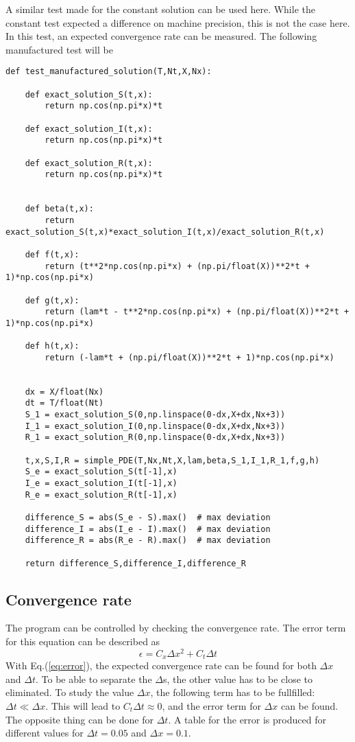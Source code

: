 \documentclass[%
twoside,                 %
final,                   %
chapterprefix=true,      %
open=right               %
10pt]{book}
\begin{document}
A similar test made for the constant solution can be used here. While the constant test expected a difference on machine precision, this is not the case here. In this test, an expected convergence rate can be measured. The following manufactured test will be

\begin{Verbatim}[numbers=none,fontsize=\fontsize{9pt}{9pt},baselinestretch=0.95]
def test_manufactured_solution(T,Nt,X,Nx):
    
    def exact_solution_S(t,x):
        return np.cos(np.pi*x)*t

    def exact_solution_I(t,x):
        return np.cos(np.pi*x)*t

    def exact_solution_R(t,x):
        return np.cos(np.pi*x)*t


    def beta(t,x):
        return exact_solution_S(t,x)*exact_solution_I(t,x)/exact_solution_R(t,x)
   
    def f(t,x):
        return (t**2*np.cos(np.pi*x) + (np.pi/float(X))**2*t + 1)*np.cos(np.pi*x) 

    def g(t,x):
        return (lam*t - t**2*np.cos(np.pi*x) + (np.pi/float(X))**2*t + 1)*np.cos(np.pi*x)

    def h(t,x):
        return (-lam*t + (np.pi/float(X))**2*t + 1)*np.cos(np.pi*x)
        

    dx = X/float(Nx)
    dt = T/float(Nt)
    S_1 = exact_solution_S(0,np.linspace(0-dx,X+dx,Nx+3))
    I_1 = exact_solution_I(0,np.linspace(0-dx,X+dx,Nx+3))
    R_1 = exact_solution_R(0,np.linspace(0-dx,X+dx,Nx+3))
     
    t,x,S,I,R = simple_PDE(T,Nx,Nt,X,lam,beta,S_1,I_1,R_1,f,g,h)
    S_e = exact_solution_S(t[-1],x)
    I_e = exact_solution_I(t[-1],x)
    R_e = exact_solution_R(t[-1],x)
    
    difference_S = abs(S_e - S).max()  # max deviation
    difference_I = abs(I_e - I).max()  # max deviation
    difference_R = abs(R_e - R).max()  # max deviation

    return difference_S,difference_I,difference_R
\end{Verbatim}

\subsection{Convergence rate}
The program can be controlled by checking the convergence rate. The error term  for this equation can be described as  
\begin{equation} \label{eq:error}
    \epsilon = C_x\Delta x^2 + C_t \Delta t
\end{equation}
With Eq.(\ref{eq:error}), the expected convergence rate can be found for both $\Delta x$ and $\Delta t$. To be able to separate the $\Delta$s, the other value has to be close to eliminated. To study the value $\Delta x$, the following term has to be fullfilled: $\Delta t \ll \Delta x$. This will lead to $C_t\Delta t \approx 0$, and the error term for $\Delta x$ can be found. The opposite thing can  be done for $\Delta t$. A table for the error is produced for different values for $\Delta t = 0.05$ and $\Delta x=0.1$.
\end{document}
